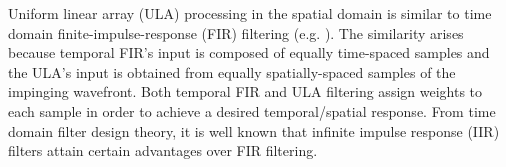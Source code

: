 Uniform linear array (ULA) processing in the spatial domain is similar to time domain finite-impulse-response (FIR) filtering (e.g. \cite{van1988beamforming}).
The similarity arises because temporal FIR's input is composed of equally time-spaced samples and the ULA's input is obtained from equally spatially-spaced samples of the impinging wavefront.
Both temporal FIR and ULA filtering assign weights to each sample in order to achieve a desired temporal/spatial response.
From time domain filter design theory, it is well known that infinite impulse response (IIR) filters attain certain advantages over FIR filtering.